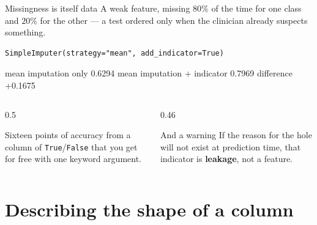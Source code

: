\documentclass[aspectratio=169]{beamer}
\begin{document}
\begin{frame}[fragile,shrink=4]{Missingness is itself data}
A weak feature, missing $80\%$ of the time for one class and $20\%$ for the
other --- a test ordered only when the clinician already suspects something.
\begin{lstlisting}
SimpleImputer(strategy="mean", add_indicator=True)
\end{lstlisting}
\begin{outblk}
  mean imputation only          0.6294
  mean imputation + indicator   0.7969
  difference                   +0.1675
\end{outblk}
\begin{columns}[T]
  \begin{column}{0.5\textwidth}
    \begin{exampleblock}{Sixteen points of accuracy}
      \small from a column of \texttt{True}/\texttt{False} that you get for
      free with one keyword argument.
    \end{exampleblock}
  \end{column}
  \begin{column}{0.46\textwidth}
    \begin{alertblock}{And a warning}
      \small If the reason for the hole will not exist at prediction time,
      that indicator is \textbf{leakage}, not a feature.
    \end{alertblock}
  \end{column}
\end{columns}
\end{frame}

\section[Shape]{Describing the shape of a column}
\label{sec:shape}
\end{document}
